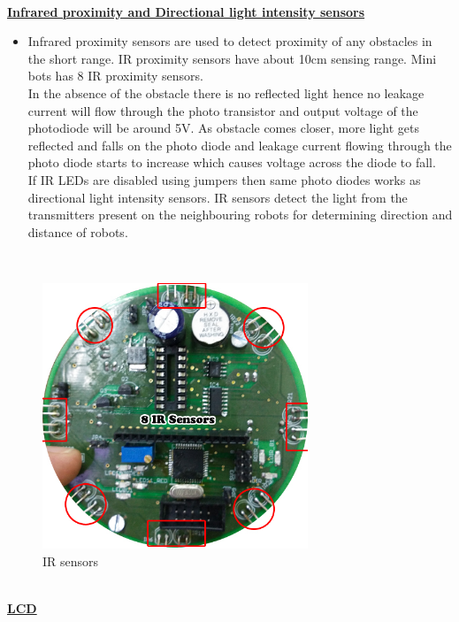 \documentclass[a4paper,12pt,oneside]{book}
\begin{document}
\newpage
\hfill\\
\underline{\textbf{\Large{Infrared proximity and Directional light intensity sensors}}}
\begin{itemize}
	\item {
		Infrared proximity sensors are used to detect proximity of any obstacles in the short range. IR
		proximity sensors have about 10cm sensing range. Mini bots has 8 IR proximity sensors.\\
		In the absence of the obstacle there is no reflected light hence no leakage current will flow
		through the photo transistor and output voltage of the photodiode will be around 5V. As obstacle
		comes closer, more light gets reflected and falls on the photo diode and leakage current flowing
		through the photo diode starts to increase which causes voltage across the diode to fall.\\
		If IR LEDs are disabled using jumpers then same photo diodes works as directional light
		intensity sensors.
		IR sensors detect the light from the transmitters present on the neighbouring robots for determining direction and distance of robots.\\
	}
	\end{itemize}

	\hfill\\
	\begin{figure}[h!]
		\caption{IR sensors}
		\includegraphics[width=300px]{./HardwareManual/IR_Sensor.jpg}
	\end{figure}	
	\hfill\\
	\newpage
	\underline{\textbf{\Large{LCD}}}
		
\end{document}
